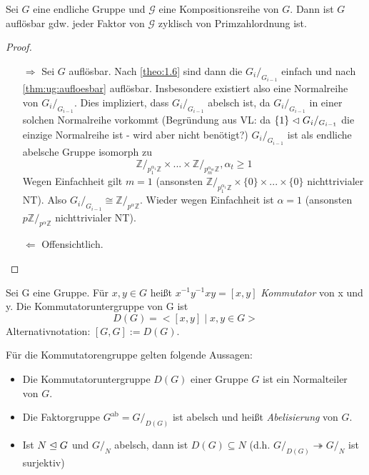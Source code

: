 \documentclass[../main.tex]{subfiles}
\begin{document}
\begin{theorem}\label{theo:1.13}
    Sei $G$ eine endliche Gruppe und $\mathcal{G}$ eine Kompositionsreihe von $G$. Dann ist $G$ auflösbar gdw. jeder Faktor von $\mathcal{G}$ zyklisch von Primzahlordnung ist.
\end{theorem}
\begin{proof}$ $
    \begin{itemize}
        \item[$\Rightarrow$]
        Sei $G$ auflösbar. Nach \ref{theo:1.6} sind dann die $G_i/_{G_{i-1}}$ einfach und nach \cref{thm:ug:aufloesbar} auflösbar.
        Insbesondere existiert also eine Normalreihe von  $G_i/_{G_{i-1}}$.
        Dies impliziert, dass $G_i/_{G_{i-1}}$ abelsch ist, da $G_i/_{G_{i-1}}$ in einer solchen Normalreihe vorkommt (Begründung aus VL: da  $\{1\} \vartriangleleft G_i/_{G_{i-1}}$ die einzige Normalreihe ist - wird aber nicht benötigt?)
        $G_i/_{G_{i-1}}$ ist als endliche abelsche Gruppe isomorph zu
        $$\mathbb{Z}/_{p_1^{\alpha_1}\mathbb{Z}} \times ... \times \mathbb{Z}/_{p_m^{\alpha_m}\mathbb{Z}}, \alpha_t \geq 1$$
        Wegen Einfachheit gilt $m = 1$ (ansonsten $\mathbb{Z}/_{p_1^{\alpha_1}\mathbb{Z}} \times \{0\} \times ... \times \{0\}$ nichttrivialer NT). Also $G_i/_{G_{i-1}} \cong \mathbb{Z}/_{p^\alpha\mathbb{Z}}$. Wieder wegen Einfachheit ist $\alpha = 1$ (ansonsten $p \mathbb{Z}/_{p^\alpha\mathbb{Z}}$ nichttrivialer NT).
        \item[$\Leftarrow$] Offensichtlich.
    \end{itemize}
\end{proof}
\begin{definition}[Kommutator]
    Sei G eine Gruppe. Für $x,y \in G$ heißt $x^{-1}y^{-1}xy = [x,y]$ \emph{Kommutator} von x und y. Die Kommutatoruntergruppe von G ist $$D(G) = <[x,y] \mid x,y \in G>$$
    Alternativnotation: $[G,G] := D(G)$.
\end{definition}
\begin{lemma}[Abelisierung]\label{theo:1.15}
Für die Kommutatorengruppe gelten folgende Aussagen:
\begin{itemize}
    \item Die Kommutatoruntergruppe $D(G)$ einer Gruppe $G$ ist ein Normalteiler von $G$.
    \item Die Faktorgruppe $G^\text{ab} = G/_{D(G)}$ ist abelsch und heißt \emph{Abelisierung} von $G$.
    \item Ist $N \trianglelefteq G$ und $G/_N$ abelsch, dann ist $D(G) \subseteq N$ (d.h. $G/_{D(G)} \twoheadrightarrow G/_N$ ist surjektiv)
\end{itemize}
\end{lemma}
\end{document}
